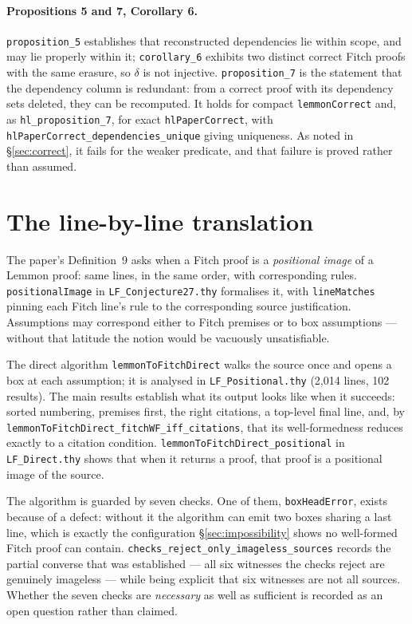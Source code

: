 \documentclass[11pt]{article}
\theoremstyle{plain}
\newcommand{\ubrk}{\_\discretionary{}{}{}}
\newcommand{\isa}[1]{\textup{\texttt{\small #1}}}
\newcommand{\thy}[1]{\textup{\texttt{\small #1}}}
\begin{document}
\paragraph{Propositions 5 and 7, Corollary 6.} \isa{proposition\ubrk{}5} establishes
that reconstructed dependencies lie within scope, and may lie properly within
it; \isa{corollary\ubrk{}6} exhibits two distinct correct Fitch proofs with the same
erasure, so $\delta$ is not injective. \isa{proposition\ubrk{}7} is the statement
that the dependency column is redundant: from a correct proof with its
dependency sets deleted, they can be recomputed. It holds for compact
\isa{lemmonCorrect} and, as \isa{hl\ubrk{}proposition\ubrk{}7}, for exact
\isa{hlPaperCorrect}, with \isa{hlPaperCorrect\ubrk{}dependencies\ubrk{}unique} giving
uniqueness. As noted in \S\ref{sec:correct}, it fails for the weaker predicate,
and that failure is proved rather than assumed.

\section{The line-by-line translation}\label{sec:direct}

The paper's Definition~9 asks when a Fitch proof is a \emph{positional image}
of a Lemmon proof: same lines, in the same order, with corresponding rules.
\isa{positionalImage} in \thy{LF\ubrk{}Conjecture27.thy} formalises it, with
\isa{lineMatches} pinning each Fitch line's rule to the corresponding source
justification. Assumptions may correspond either to Fitch premises or to box
assumptions --- without that latitude the notion would be vacuously
unsatisfiable.

The direct algorithm \isa{lemmonToFitchDirect} walks the source once and opens
a box at each assumption; it is analysed in \thy{LF\ubrk{}Positional.thy}
(2{,}014 lines, 102 results). The main results establish what its output looks like when
it succeeds: sorted numbering, premises first, the right citations, a top-level
final line, and, by
\isa{lemmonToFitchDirect\ubrk{}fitchWF\ubrk{}iff\ubrk{}citations}, that its
well-formedness reduces exactly to a citation condition.
\isa{lemmonToFitchDirect\ubrk{}positional} in \thy{LF\ubrk{}Direct.thy} shows that when it
returns a proof, that proof is a positional image of the source.

The algorithm is guarded by seven checks. One of them, \isa{boxHeadError},
exists because of a defect: without it the algorithm can emit two boxes sharing
a last line, which is exactly the configuration \S\ref{sec:impossibility} shows
no well-formed Fitch proof can contain. \isa{checks\ubrk{}reject\ubrk{}only\ubrk{}imageless\ubrk{}sources}
records the partial converse that was established --- all six witnesses the
checks reject are genuinely imageless --- while being explicit that six
witnesses are not all sources. Whether the seven checks are \emph{necessary} as
well as sufficient is recorded as an open question rather than claimed.
\end{document}
